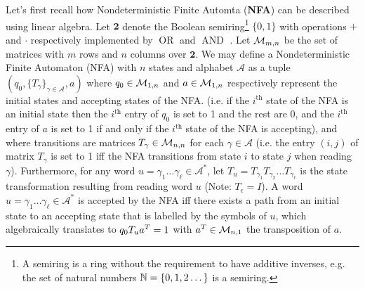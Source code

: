 Let's first recall how Nondeterministic Finite Automta (\textbf{NFA}) can be described using linear algebra. Let $\mathbf{2}$ denote the Boolean semiring\footnote{A semiring is a ring without the requirement to have additive inverses, e.g. the set of natural numbers $\mathbb{N}=\{0,1,2\dots\}$ is a semiring.} $\{0,1\}$ with operations $+$ and $\cdot$ respectively implemented by $\operatorname{OR}$ and $\operatorname{AND}$ \cite{CUNINGHAMEGREEN1991251}.
Let $\mathcal{M}_{m,n}$ be the set of matrices with $m$ rows and $n$ columns over $\mathbf{2}$. We may define a Nondeterministic Finite Automaton (NFA) with $n$ states and alphabet $\mathcal{A}$ as a tuple $(q_0, \{T_\gamma\}_{\gamma \in \mathcal{A}}, a)$ where $q_0 \in \mathcal{M}_{1,n}$ and $a \in \mathcal{M}_{1,n}$ respectively represent the initial states and accepting states of the NFA. (i.e. if the $i^\text{th}$ state of the NFA is an initial state then the $i^\text{th}$ entry of $q_0$ is set to 1 and the rest are 0, and the $i^\text{th}$ entry of $a$ is set to 1 if and only if the $i^\text{th}$ state of the NFA is accepting), and where transitions are matrices $T_\gamma\in \mathcal{M}_{n,n}$ for each $\gamma\in\mathcal{A}$ (i.e. the entry $(i,j)$ of matrix $T_\gamma$ is set to 1 iff the NFA transitions from state $i$ to state $j$ when reading $\gamma$). Furthermore, for any word $u=\gamma_1\dots\gamma_\ell \in \mathcal{A}^*$, let $T_u = T_{\gamma_1} T_{\gamma_2} \dots T_{\gamma_\ell}$ is the state transformation resulting from reading word $u$ (Note: $T_\epsilon = I$). A word $u=\gamma_1\dots\gamma_\ell \in \mathcal{A}^*$ is accepted by the NFA iff there exists a path from an initial state to an accepting state that is labelled by the symbols of $u$, which algebraically translates to $q_0 T_u a^T = 1$ with $a^T \in \mathcal{M}_{n,1}$ the transposition of $a$.

